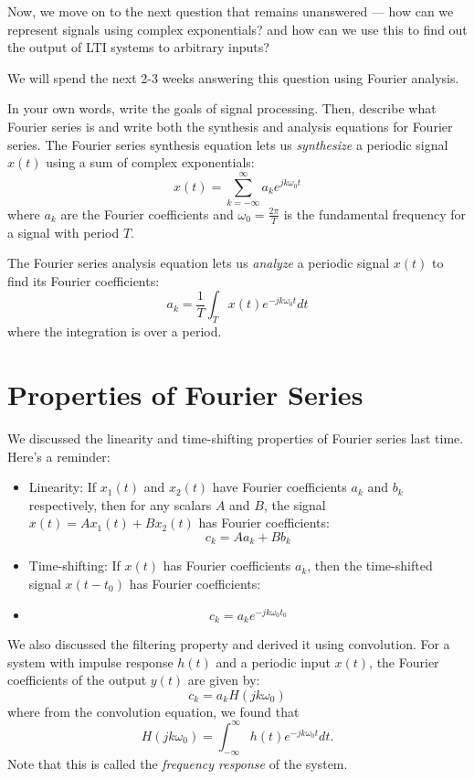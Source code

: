 \documentclass{ee102_notes}
\begin{document}
Now, we move on to the next question that remains unanswered --- how can we represent signals using complex exponentials? and how can we use this to find out the output of LTI systems to arbitrary inputs?

We will spend the next 2-3 weeks answering this question using Fourier analysis.
\begin{popquiz}
In your own words, write the goals of signal processing. Then, describe what Fourier series is and write both the synthesis and analysis equations for Fourier series.
\popqsplit
The Fourier series synthesis equation lets us \emph{synthesize} a periodic signal $x(t)$ using a sum of complex exponentials:
\[
x(t) = \sum_{k=-\infty}^{\infty} a_k e^{j k \omega_0 t}
\]
where $a_k$ are the Fourier coefficients and $\omega_0 = \frac{2\pi}{T}$ is the fundamental frequency for a signal with period $T$.

The Fourier series analysis equation lets us \emph{analyze} a periodic signal $x(t)$ to find its Fourier coefficients:
\[
a_k = \frac{1}{T} \int_{T} x(t) e^{-j k \omega_0 t} dt
\]
where the integration is over a period. 
\end{popquiz}

\section{Properties of Fourier Series}
We discussed the linearity and time-shifting properties of Fourier series last time. Here's a reminder:
\begin{itemize}
    \item Linearity: If $x_1(t)$ and $x_2(t)$ have Fourier coefficients $a_k$ and $b_k$ respectively, then for any scalars $A$ and $B$, the signal $x(t) = A x_1(t) + B x_2(t)$ has Fourier coefficients:
    \[c_k = A a_k + B b_k
    \]
    \item Time-shifting: If $x(t)$ has Fourier coefficients $a_k$, then the time-shifted signal $x(t - t_0)$ has Fourier coefficients:
    \item \[c_k = a_k e^{-j k \omega_0 t_0}
    \]
\end{itemize}

We also discussed the filtering property and derived it using convolution. For a system with impulse response $h(t)$ and a periodic input $x(t)$, the Fourier coefficients of the output $y(t)$ are given by:
\[
c_k = a_k H(j k \omega_0)
\]
where from the convolution equation, we found that 
\[
H(j k \omega_0) = \int_{-\infty}^{\infty} h(t) e^{-j k \omega_0 t} dt.
\]
Note that this is called the \emph{frequency response} of the system.
\end{document}
